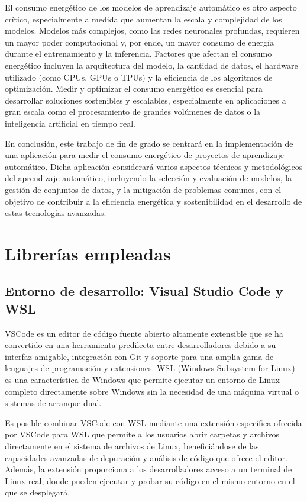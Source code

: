 El consumo energético de los modelos de aprendizaje automático es otro aspecto crítico, especialmente a medida que aumentan la escala y complejidad de los modelos. Modelos más complejos, como las redes neuronales profundas, requieren un mayor poder computacional y, por ende, un mayor consumo de energía durante el entrenamiento y la inferencia. Factores que afectan el consumo energético incluyen la arquitectura del modelo, la cantidad de datos, el hardware utilizado (como CPUs, GPUs o TPUs) y la eficiencia de los algoritmos de optimización. Medir y optimizar el consumo energético es esencial para desarrollar soluciones sostenibles y escalables, especialmente en aplicaciones a gran escala como el procesamiento de grandes volúmenes de datos o la inteligencia artificial en tiempo real.

En conclusión, este trabajo de fin de grado se centrará en la implementación de una aplicación para medir el consumo energético de proyectos de aprendizaje automático. Dicha aplicación considerará varios aspectos técnicos y metodológicos del aprendizaje automático, incluyendo la selección y evaluación de modelos, la gestión de conjuntos de datos, y la mitigación de problemas comunes, con el objetivo de contribuir a la eficiencia energética y sostenibilidad en el desarrollo de estas tecnologías avanzadas.

\section{Librerías empleadas}

\subsection{Entorno de desarrollo: Visual Studio Code y WSL}
\label{sec:dev-env}


VSCode es un editor de código fuente abierto altamente extensible que se ha convertido en una herramienta predilecta entre desarrolladores debido a su interfaz amigable, integración con Git y soporte para una amplia gama de lenguajes de programación y extensiones. WSL (Windows Subsystem for Linux) es una característica de Windows que permite ejecutar un entorno de Linux completo directamente sobre Windows sin la necesidad de una máquina virtual o sistemas de arranque dual.

Es posible combinar VSCode con WSL mediante una extensión específica ofrecida por VSCode para WSL que permite a los usuarios abrir carpetas y archivos directamente en el sistema de archivos de Linux, beneficiándose de las capacidades avanzadas de depuración y análisis de código que ofrece el editor. Además, la extensión proporciona a los desarrolladores acceso a un terminal de Linux real, donde pueden ejecutar y probar su código en el mismo entorno en el que se desplegará. 



